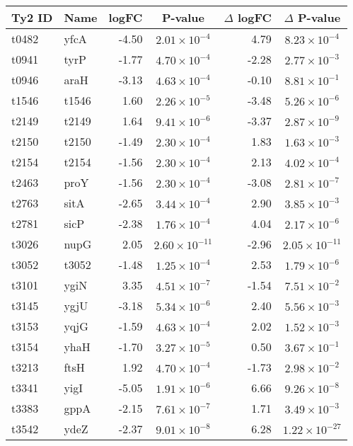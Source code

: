 \begin{table}
\begin{tabular}{ l
    				l
				r
    				c
				r
				c
				}
    \\
     \toprule
    \textbf{Ty2 ID} & \textbf{Name} & \textbf{logFC} & \textbf{P-value} & \textbf{$\Delta$ logFC} & \textbf{$\Delta$ P-value} \\
    \midrule
    t0482 & yfcA & -4.50 & $2.01\times10^{-4}$ & 4.79 & $8.23\times10^{-4}$\\
    t0941 & tyrP & -1.77 & $4.70\times10^{-4}$ & -2.28 & $2.77\times10^{-3}$\\
    t0946 & araH & -3.13 & $4.63\times10^{-4}$ & -0.10 & $8.81\times10^{-1}$\\
    t1546 & t1546 & 1.60 & $2.26\times10^{-5}$ & -3.48 & $5.26\times10^{-6}$\\
    t2149 & t2149 & 1.64 & $9.41\times10^{-6}$ & -3.37 & $2.87\times10^{-9}$\\
    t2150 & t2150 & -1.49 & $2.30\times10^{-4}$ & 1.83 & $1.63\times10^{-3}$\\
    t2154 & t2154 & -1.56 & $2.30\times10^{-4}$ & 2.13 & $4.02\times10^{-4}$\\
    t2463 & proY & -1.56 & $2.30\times10^{-4}$ & -3.08 & $2.81\times10^{-7}$\\
    t2763 & sitA & -2.65 & $3.44\times10^{-4}$ & 2.90 & $3.85\times10^{-3}$\\
    t2781 & sicP & -2.38 & $1.76\times10^{-4}$ & 4.04 & $2.17\times10^{-6}$\\
    t3026 & nupG & 2.05 & $2.60\times10^{-11}$ & -2.96 & $2.05\times10^{-11}$\\
    t3052 & t3052 & -1.48 & $1.25\times10^{-4}$ & 2.53 & $1.79\times10^{-6}$\\
    t3101 & ygiN & 3.35 & $4.51\times10^{-7}$ & -1.54 & $7.51\times10^{-2}$\\
    t3145 & ygjU & -3.18 & $5.34\times10^{-6}$ & 2.40 & $5.56\times10^{-3}$\\
    t3153 & yqjG & -1.59 & $4.63\times10^{-4}$ & 2.02 & $1.52\times10^{-3}$\\
    t3154 & yhaH & -1.70 & $3.27\times10^{-5}$ & 0.50 & $3.67\times10^{-1}$\\
    t3213 & ftsH & 1.92 & $4.70\times10^{-4}$ & -1.73 & $2.98\times10^{-2}$\\
    t3341 & yigI & -5.05 & $1.91\times10^{-6}$ & 6.66 & $9.26\times10^{-8}$\\
    t3383 & gppA & -2.15 & $7.61\times10^{-7}$ & 1.71 & $3.49\times10^{-3}$\\
    t3542 & ydeZ & -2.37 & $9.01\times10^{-8}$ & 6.28 & $1.22\times10^{-27}$\\

\end{tabular}
\end{table}
